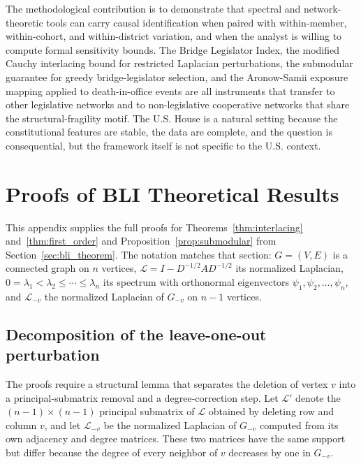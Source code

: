 \documentclass[12pt, a4paper]{article}
\begin{document}
The methodological contribution is to demonstrate that spectral and network-theoretic tools can carry causal identification when paired with within-member, within-cohort, and within-district variation, and when the analyst is willing to compute formal sensitivity bounds. The Bridge Legislator Index, the modified Cauchy interlacing bound for restricted Laplacian perturbations, the submodular guarantee for greedy bridge-legislator selection, and the Aronow-Samii exposure mapping applied to death-in-office events are all instruments that transfer to other legislative networks and to non-legislative cooperative networks that share the structural-fragility motif. The U.S. House is a natural setting because the constitutional features are stable, the data are complete, and the question is consequential, but the framework itself is not specific to the U.S. context.




\appendix

\section{Proofs of BLI Theoretical Results}\label{app:bli_proofs}

This appendix supplies the full proofs for Theorems~\ref{thm:interlacing} and~\ref{thm:first_order} and Proposition~\ref{prop:submodular} from Section~\ref{sec:bli_theorem}. The notation matches that section: $G = (V, E)$ is a connected graph on $n$ vertices, $\mathcal{L} = I - D^{-1/2} A D^{-1/2}$ its normalized Laplacian, $0 = \lambda_1 < \lambda_2 \leq \cdots \leq \lambda_n$ its spectrum with orthonormal eigenvectors $\psi_1, \psi_2, \ldots, \psi_n$, and $\mathcal{L}_{-v}$ the normalized Laplacian of $G_{-v}$ on $n - 1$ vertices.

\subsection{Decomposition of the leave-one-out perturbation}\label{app:bli_decomp}

The proofs require a structural lemma that separates the deletion of vertex $v$ into a principal-submatrix removal and a degree-correction step. Let $\mathcal{L}'$ denote the $(n-1) \times (n-1)$ principal submatrix of $\mathcal{L}$ obtained by deleting row and column $v$, and let $\mathcal{L}_{-v}$ be the normalized Laplacian of $G_{-v}$ computed from its own adjacency and degree matrices. These two matrices have the same support but differ because the degree of every neighbor of $v$ decreases by one in $G_{-v}$.
\end{document}
